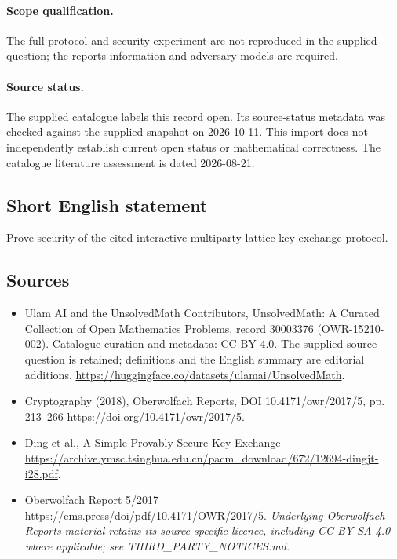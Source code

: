 \documentclass[11pt]{article}
\begin{document}
\paragraph{Scope qualification.}
The full protocol and security experiment are not reproduced in the supplied question; the report\textquotesingle s information and adversary models are required.
\paragraph{Source status.}
The supplied catalogue labels this record open. Its source-status metadata was checked against the supplied snapshot on 2026-10-11. This import does not independently establish current open status or mathematical correctness. The catalogue literature assessment is dated 2026-08-21.
\subsection{Short English statement}
Prove security of the cited interactive multiparty lattice key-exchange protocol.
\subsection{Sources}
\begin{itemize}
\item[S1] Ulam AI and the UnsolvedMath Contributors, UnsolvedMath: A Curated Collection of Open Mathematics Problems, record 30003376 (OWR-15210-002). Catalogue curation and metadata: CC BY 4.0. The supplied source question is retained; definitions and the English summary are editorial additions.
\url{https://huggingface.co/datasets/ulamai/UnsolvedMath}.
\item[S2] Cryptography (2018), Oberwolfach Reports, DOI 10.4171/owr/2017/5, pp. 213--266
\url{https://doi.org/10.4171/owr/2017/5}.
\item[S3] Ding et al., A Simple Provably Secure Key Exchange
\url{https://archive.ymsc.tsinghua.edu.cn/pacm_download/672/12694-dingjt-i28.pdf}.
\item[S4] Oberwolfach Report 5/2017
\url{https://ems.press/doi/pdf/10.4171/OWR/2017/5}.
\textit{Underlying Oberwolfach Reports material retains its source-specific licence, including CC BY-SA 4.0 where applicable; see THIRD\_PARTY\_NOTICES.md.}
\end{itemize}
\end{document}
